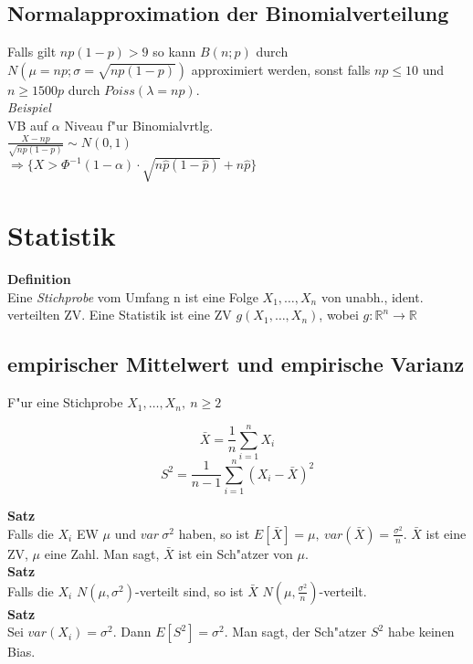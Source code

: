 \documentclass[10pt, a4paper, twocolumn]{scrartcl}
\begin{document}
\subsection{Normalapproximation der Binomialverteilung}

Falls gilt $np(1-p)>9$ so kann $B(n;p)$ durch $N(\mu=np;\sigma=\sqrt{np(1-p)})$ approximiert werden, sonst falls $np\leq 10$ und $n\geq 1500p$ durch $Poiss(\lambda=np)$.\\

\textit{Beispiel}\\

VB auf $\alpha$ Niveau f"ur Binomialvrtlg.\\
$\frac{X-np}{\sqrt{np(1-p)}}\sim N(0,1)$\\
$\Rightarrow \{X>\Phi^{-1}(1-\alpha)\cdotp\sqrt{n\hat{p}(1-\hat{p})}+n\hat{p}\}$


\section{Statistik}

\textbf{Definition}\\
Eine \textit{Stichprobe} vom Umfang n ist eine Folge $X_1,\ldots,X_n$ von unabh., ident. verteilten ZV. Eine Statistik ist eine ZV $g(X_1,\ldots,X_n)$, wobei $g:\mathbb{R}^n\rightarrow \mathbb{R}$\\

\subsection{empirischer Mittelwert und empirische Varianz}

F"ur eine Stichprobe $X_1,\ldots,X_n,\:n\geq 2$

$$\bar{X}=\frac{1}{n}\sum\limits^{n}_{i=1}X_i$$
$$S^2=\frac{1}{n-1}\sum\limits^n_{i=1}(X_i-\bar{X})^2$$

\textbf{Satz}\\
Falls die $X_i$ EW $\mu$ und $var\: \sigma^2$ haben, so ist $E[\bar{X}]=\mu,\:var(\bar{X})=\frac{\sigma^2}{n}$. $\bar{X}$ ist eine ZV, $\mu$ eine Zahl. Man sagt, $\bar{X}$ ist ein Sch"atzer von $\mu$.\\

\textbf{Satz}\\
Falls die $X_i$ $N(\mu,\sigma^2)$-verteilt sind, so ist $\bar{X}$ $N(\mu,\frac{\sigma^2}{n})$-verteilt.\\

\textbf{Satz}\\
Sei $var(X_i)=\sigma^2$. Dann $E[S^2]=\sigma^2$. Man sagt, der Sch"atzer $S^2$ habe keinen Bias.
\end{document}
